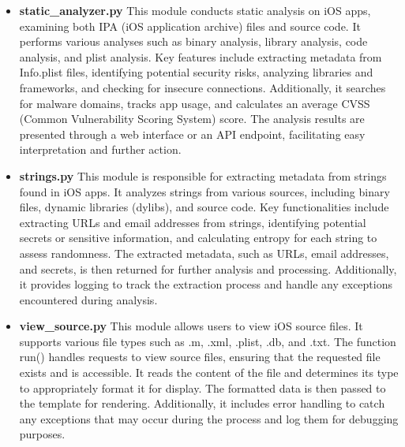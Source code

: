 \documentclass{report}
\begin{document}
\begin{itemize}
\begin{itemize}
\begin{itemize}
                    \item \textbf{static\_analyzer.py}
                    This module conducts static analysis on iOS apps, examining both IPA (iOS application archive) files and source code. It performs various analyses such as binary analysis, library analysis, code analysis, and plist analysis. Key features include extracting metadata from Info.plist files, identifying potential security risks, analyzing libraries and frameworks, and checking for insecure connections. Additionally, it searches for malware domains, tracks app usage, and calculates an average CVSS (Common Vulnerability Scoring System) score. The analysis results are presented through a web interface or an API endpoint, facilitating easy interpretation and further action.
                    \item \textbf{strings.py}
                    This module is responsible for extracting metadata from strings found in iOS apps. It analyzes strings from various sources, including binary files, dynamic libraries (dylibs), and source code. Key functionalities include extracting URLs and email addresses from strings, identifying potential secrets or sensitive information, and calculating entropy for each string to assess randomness. The extracted metadata, such as URLs, email addresses, and secrets, is then returned for further analysis and processing. Additionally, it provides logging to track the extraction process and handle any exceptions encountered during analysis.
                    \item \textbf{view\_source.py}
                    This module allows users to view iOS source files. It supports various file types such as .m, .xml, .plist, .db, and .txt. The function run() handles requests to view source files, ensuring that the requested file exists and is accessible. It reads the content of the file and determines its type to appropriately format it for display. The formatted data is then passed to the template for rendering. Additionally, it includes error handling to catch any exceptions that may occur during the process and log them for debugging purposes.
                    
                \end{itemize}


\end{itemize}
\end{itemize}
\end{document}
